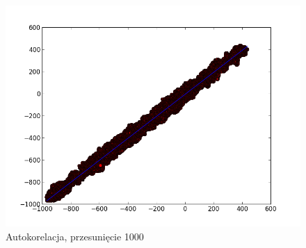 \documentclass[a4paper, 12pt]{article}
\begin{document}
\begin{figure}[h]
\includegraphics[scale=0.5]{out1000.png}
\caption{Autokorelacja, przesunięcie 1000}
\label{fig:kor1000}
\end{figure}
\end{document}
